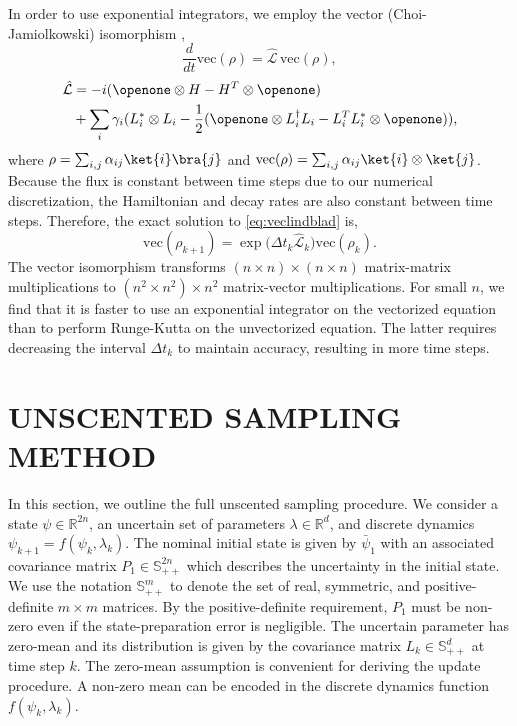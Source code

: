 \documentclass[
  amsfonts,
  amsmath,
  amssymb,
  pra,
  twocolumn,
  superscriptaddress,
]{revtex4-2}
\begin{document}
In order to use exponential integrators, we employ
the vector (Choi-Jamiolkowski) isomorphism \cite{Landi2018},
\begin{equation}
  \frac{d}{dt} \textrm{vec}({\rho}) = \hat{\mathcal{L}}\, \textrm{vec}({\rho})
  \label{eq:veclindblad},
\end{equation}
\begin{equation}
  \begin{aligned}
    \hat{\mathcal{L}} &= -i(\openone \otimes H - H^{T} \otimes \openone)\\
    &+ \sum_{i} \gamma_{i}
    (L_{i}^{*} \otimes L_{i} - \frac{1}{2} (\openone \otimes L_{i}^{\dagger}L_{i}
    - L_{i}^{T}L_{i}^{*} \otimes \openone)),
  \end{aligned}
\end{equation}
where $\rho = \sum_{i, j} \alpha_{ij} \ket{i}\bra{j}$
and $\textrm{vec}(\rho) = \sum_{i, j} \alpha_{ij} \ket{i} \otimes \ket{j}$.
Because the flux is constant between time steps
due to our numerical discretization,
the Hamiltonian and decay rates are also constant
between time steps.
Therefore, the exact solution to \eqref{eq:veclindblad} is,
\begin{equation}
  \textrm{vec}(\rho_{k + 1}) = {\exp}{\textstyle(}\Delta t_{k}
  \hat{\mathcal{L}}_{k}{\textstyle)} \textrm{vec}(\rho_{k}).
\end{equation}
The vector isomorphism transforms $(n \times n) \times (n \times n)$
matrix-matrix multiplications to $(n^{2} \times n^{2}) \times n^{2}$ matrix-vector
multiplications. For small $n$, we find that it is
faster to use an exponential integrator on the vectorized equation than to perform
Runge-Kutta on the unvectorized equation.
The latter requires decreasing the interval $\Delta t_{k}$
to maintain accuracy, resulting in more time steps.

\section{UNSCENTED SAMPLING METHOD}
\label{appendix:unscented}
In this section, we outline the full unscented sampling procedure.
We consider a state $\psi \in \mathbb{R}^{2n}$, 
an uncertain set of parameters $\lambda\in \mathbb{R}^{d}$, and discrete dynamics
$\psi_{k + 1} = f(\psi_{k}, \lambda_{k})$.
The nominal initial state is given by $\bar{\psi}_{1}$ with an associated
covariance matrix $P_{1} \in \mathbb{S}_{++}^{2n}$
which describes the uncertainty in the initial state.
We use the notation $\mathbb{S}_{++}^{m}$ to denote the
set of real, symmetric, and positive-definite $m \times m$ matrices.
By the positive-definite requirement, $P_{1}$ must be non-zero even if the state-preparation error
is negligible.
The uncertain parameter has zero-mean
and its distribution is given by the covariance matrix
$L_{k} \in \mathbb{S}_{++}^{d}$ at time step $k$. The zero-mean assumption
is convenient for deriving the update procedure. A non-zero mean can be encoded
in the discrete dynamics function $f(\psi_{k}, \lambda_{k})$.
\end{document}
